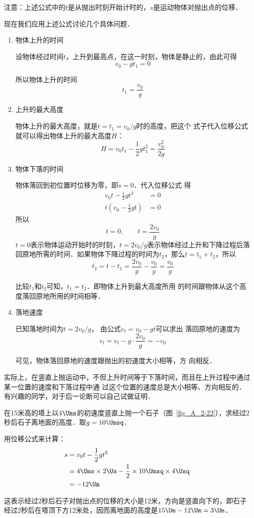 注意：上述公式中的$t$是从抛出时刻开始计时的，$s$是运动物体对抛出点的位移．

现在我们应用上述公式讨论几个具体问题．
\begin{enumerate}[(1)]
	\item  物体上升的时间
	
	设物体经过时间$t$，上升到最高点，在这一时刻，物体是静止的，由此可得
	\[v_0-gt_1=0 \]
	
	所以物体上升的时间
	\[t_1=\frac{v_0}{g} \]
	
	\item 上升的最大高度
	
	物体上升的最大高度，就是$t=t_1=v_0/g$时的高度，把这个
	式子代入位移公式就可以得出物体上升的最大高度$H$：
	\[H=v_0t_1-\frac{1}{2}gt_1^2=\frac{v^2_0}{2g} \]
	
	\item 物体下落的时间
	
	物体落回到初位置时位移为零，即$s=0$．代入位移公式
	得
	\[\begin{split}
	v_0 t-\frac{1}{2}gt^2&=0\\
	t\left(v_0-\frac{1}{2}gt\right)&=0
	\end{split} \]
	所以
	\[t=0,\qquad t=\frac{2v_0}{g} \]
	$t=0$表示物体运动开始时的时刻，$t=2v_0/g$表示物体经过上升和下降过程后落回原地所需的时间．如果物体下降过程的时间为$t_2$，那么$t=t_1+t_2$，所以
	\[t_2=t-t_1=\frac{2v_0}{g}-\frac{v_0}{g}=\frac{v_0}{g} \]
	
	比较$t_1$和$t_2$可知，$t_1=t_2$．即物体上升到最大高度所用
	的时间跟物体从这个高度落回原地所用的时间相等．
	
	\item 落地速度
	
	已知落地时间为$t=2v_0/g$，
	由公式$v_t=v_0-gt$可以求出
	落回原地的速度为
	\[v_t=v_t-g\cdot \frac{2v_0}{g}=-v_0 \]
	
	可见，物体落回原地的速度跟抛出的初速度大小相等，方
	向相反．
\end{enumerate}

实际上，在竖直上抛运动中，不但上升时间等于下落时间，而且在上升过程中通过某一位置的速度和下落过程中通
过这个位置的速度总是大小相等、方向相反的．有兴趣的同学，对于后一论断可以自己试做证明．

\begin{example}
在15米高的塔上以4$\Ums$的初速度竖直上抛一个石子（图~\ref{fig_A_2-22}），求经过2秒后石子离地面的高度．取$g=10\Umsq$．
\end{example}

\begin{solution}
用位移公式来计算：
\[\begin{split}
s&=v_0 t-\frac{1}{2}gt^2\\
&=4\Ums \times 2 \Us -\frac{1}{2}\times 10\Umsq \times 4 \Usq \\
&=-12 \Um
\end{split} \]

这表示经过2秒后石子对抛出点的位移的大小是12米，方向是竖直向下的，即石子经过2秒后在塔顶下方12米处，因而离地面的高度是$15 \Um -12 \Um=3 \Um$．
\end{solution}

